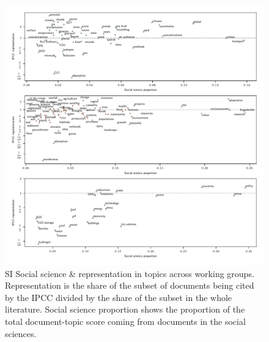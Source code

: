\documentclass{article}
\begin{document}
\begin{figure}
	\begin{center}
		\includegraphics[width=1\linewidth]{../plots_pub/wgs_socsci.pdf}
		\caption{SI Social science \& representation in topics across working groups. Representation is the share of the subset of documents being cited by the IPCC divided by the share of the subset in the whole literature. Social science proportion shows the proportion of the total document-topic score coming from documents in the social sciences.}
		\label{socsci-wgs}
	\end{center}
\end{figure}
\end{document}
